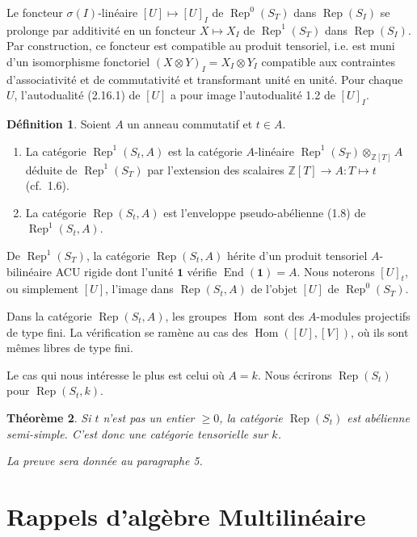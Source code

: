 \documentclass[11pt,a4paper]{article}
\theoremstyle{plain}
\newtheorem{theorem}{Th\'eor\`eme}[section]
\theoremstyle{definition}
\newtheorem{definition}[theorem]{D\'efinition}
\DeclareMathOperator{\Hom}{Hom}
\DeclareMathOperator{\End}{End}
\DeclareMathOperator{\Rep}{Rep}
\newcommand{\Z}{\mathbb{Z}}
\begin{document}
Le foncteur $\sigma(I)$-lin\'eaire $[U] \mapsto [U]_I$ de $\Rep^0(S_T)$ dans $\Rep(S_I)$ se prolonge par additivit\'e en un foncteur $X \mapsto X_I$ de $\Rep^1(S_T)$ dans $\Rep(S_I)$. Par construction, ce foncteur est compatible au produit tensoriel, i.e. est muni d'un isomorphisme fonctoriel $(X \otimes Y)_I = X_I \otimes Y_I$ compatible aux contraintes d'associativit\'e et de commutativit\'e et transformant unit\'e en unit\'e. Pour chaque $U$, l'autodualit\'e (2.16.1) de $[U]$ a pour image l'autodualit\'e 1.2 de $[U]_I$.

\begin{definition}
Soient $A$ un anneau commutatif et $t \in A$.
\begin{enumerate}[label=(\roman*)]
\item La cat\'egorie $\Rep^1(S_t, A)$ est la cat\'egorie $A$-lin\'eaire $\Rep^1(S_T) \otimes_{\Z[T]} A$ d\'eduite de $\Rep^1(S_T)$ par l'extension des scalaires $\Z[T] \to A : T \mapsto t$ (cf.~1.6).
\item La cat\'egorie $\Rep(S_t, A)$ est l'enveloppe pseudo-ab\'elienne (1.8) de $\Rep^1(S_t, A)$.
\end{enumerate}

De $\Rep^1(S_T)$, la cat\'egorie $\Rep(S_t, A)$ h\'erite d'un produit tensoriel $A$-bilin\'eaire ACU rigide dont l'unit\'e $\mathbf{1}$ v\'erifie $\End(\mathbf{1}) = A$. Nous noterons $[U]_t$, ou simplement $[U]$, l'image dans $\Rep(S_t, A)$ de l'objet $[U]$ de $\Rep^0(S_T)$.

Dans la cat\'egorie $\Rep(S_t, A)$, les groupes $\Hom$ sont des $A$-modules projectifs de type fini. La v\'erification se ram\`ene au cas des $\Hom([U], [V])$, o\`u ils sont m\^emes libres de type fini.
\end{definition}

Le cas qui nous int\'eresse le plus est celui o\`u $A = k$. Nous \'ecrirons $\Rep(S_t)$ pour $\Rep(S_t, k)$.

\begin{theorem}
Si $t$ n'est pas un entier $\geq 0$, la cat\'egorie $\Rep(S_t)$ est ab\'elienne semi-simple. C'est donc une cat\'egorie tensorielle sur $k$.

La preuve sera donn\'ee au paragraphe 5.
\end{theorem}


\section{Rappels d'alg\`ebre Multilin\'eaire}
\end{document}
